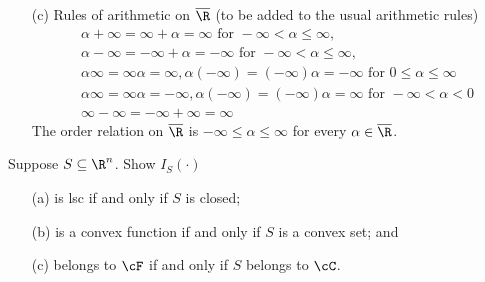 \documentclass[12pt]{article}
\begin{document}
\begin{itemize}
\begin{proof}
\end{proof}
%
%
\item[(c)]  Rules of arithmetic on $\overline{\R}$ (to be added to the usual arithmetic rules)
\begin{align*} 
	&\alpha + \infty = \infty + \alpha = \infty \text{ for } -\infty<\alpha\leq\infty, \\
	&\alpha - \infty = -\infty + \alpha = -\infty \text{ for } -\infty<\alpha\leq\infty, \\
	&\alpha\infty=\infty\alpha=\infty, \alpha(-\infty)=(-\infty)\alpha=-\infty \text{ for } 0\leq\alpha\leq\infty \\
	&\alpha\infty=\infty\alpha=-\infty, \alpha(-\infty)=(-\infty)\alpha=\infty \text{ for } -\infty<\alpha<0\\
	&\infty-\infty = -\infty+\infty = \infty
\end{align*}
The order relation on $\overline{\R}$ is $-\infty\leq\alpha\leq\infty$ for every $\alpha\in\overline{\R}$.
\end{itemize}

\pagebreak

{\blue
\begin{exer}  Suppose $S\subseteq \R^n$.  Show $I_S(\cdot)$
\begin{itemize}
	\item[(a)] is lsc if and only if $S$ is closed;
	\item[(b)] is a convex function if and only if $S$ is a convex set; and
	\item[(c)] belongs to $\cF$ if and only if $S$ belongs to $\cC$.
\end{itemize}
\end{exer}
}
\end{document}
